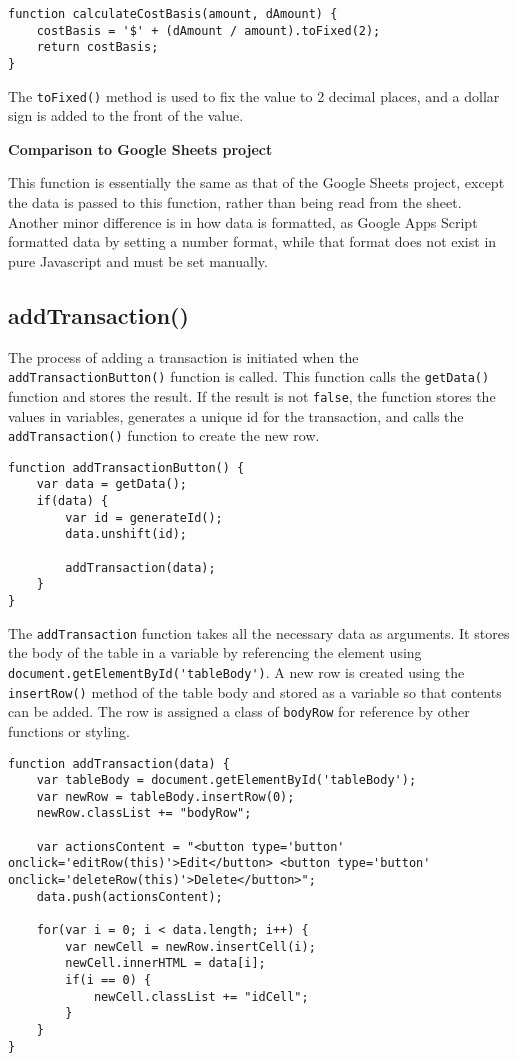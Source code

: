 \documentclass[letterpaper]{article}
\begin{document}
\begin{lstlisting}[firstnumber=134]
function calculateCostBasis(amount, dAmount) {
    costBasis = '$' + (dAmount / amount).toFixed(2);
    return costBasis;
}
\end{lstlisting}

The \lstinline{toFixed()} method is used to fix the value to 2 decimal places, and a dollar sign is added to the front of the value.

\textbf{Comparison to Google Sheets project}

This function is essentially the same as that of the Google Sheets project, except the data is passed to this function, rather than being read from the sheet.
Another minor difference is in how data is formatted, as Google Apps Script formatted data by setting a number format, while that format does not exist in pure Javascript and must be set manually.

\subsection{addTransaction()}

The process of adding a transaction is initiated when the \lstinline{addTransactionButton()} function is called.
This function calls the \lstinline{getData()} function and stores the result.
If the result is not \lstinline{false}, the function stores the values in variables, generates a unique id for the transaction, and calls the \lstinline{addTransaction()} function to create the new row.

\begin{lstlisting}[firstnumber=156]
function addTransactionButton() {
    var data = getData();
    if(data) {
        var id = generateId();
        data.unshift(id);

        addTransaction(data);
    }
}
\end{lstlisting}

The \lstinline{addTransaction} function takes all the necessary data as arguments.
It stores the body of the table in a variable by referencing the element using \lstinline{document.getElementById('tableBody')}.
A new row is created using the \lstinline{insertRow()} method of the table body and stored as a variable so that contents can be added.
The row is assigned a class of \lstinline{bodyRow} for reference by other functions or styling.

\begin{lstlisting}[firstnumber=139]
function addTransaction(data) {
    var tableBody = document.getElementById('tableBody');
    var newRow = tableBody.insertRow(0);
    newRow.classList += "bodyRow";

    var actionsContent = "<button type='button' onclick='editRow(this)'>Edit</button> <button type='button' onclick='deleteRow(this)'>Delete</button>";
    data.push(actionsContent);

    for(var i = 0; i < data.length; i++) {
        var newCell = newRow.insertCell(i);
        newCell.innerHTML = data[i];
        if(i == 0) {
            newCell.classList += "idCell";
        }
    }
}
\end{lstlisting}
\end{document}
